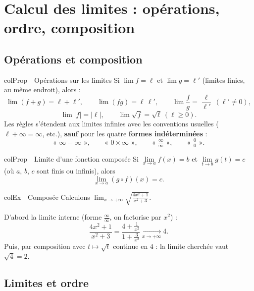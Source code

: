 \documentclass[11pt,a4paper]{article}
\newenvironment{propriete}[1][Propriété]
  {\begin{fiche}{colProp}{\ding{72}~~#1}}{\end{fiche}}
\newenvironment{exemple}[1][Exemple]
  {\begin{fiche}{colEx}{\ding{217}~~#1}}{\end{fiche}}
\begin{document}
\section{Calcul des limites : opérations, ordre, composition}

\subsection{Opérations et composition}

\begin{propriete}[Opérations sur les limites]
Si $\lim f = \ell$ et $\lim g = \ell'$ (limites finies, au même endroit), alors :
\[
  \lim (f + g) = \ell + \ell', \qquad
  \lim (fg) = \ell\,\ell', \qquad
  \lim \frac{f}{g} = \frac{\ell}{\ell'} \ (\ell' \neq 0),
\]
\[
  \lim |f| = |\ell|, \qquad
  \lim \sqrt{f} = \sqrt{\ell} \ (\ell \geq 0).
\]
Les règles s'étendent aux limites infinies avec les conventions usuelles ($\ell + \infty = \infty$, etc.), \textbf{sauf} pour les quatre \textbf{formes indéterminées} :
\[
  \text{« } \infty - \infty \text{ »}, \qquad
  \text{« } 0 \times \infty \text{ »}, \qquad
  \text{« } \tfrac{\infty}{\infty} \text{ »}, \qquad
  \text{« } \tfrac{0}{0} \text{ »}.
\]
\end{propriete}

\begin{propriete}[Limite d'une fonction composée]
Si $\lim\limits_{x \to a} f(x) = b$ et $\lim\limits_{t \to b} g(t) = c$ (où $a$, $b$, $c$ sont finis ou infinis), alors
\[
  \lim_{x \to a} (g \circ f)(x) = c.
\]
\end{propriete}

\begin{exemple}[Composée]
Calculons $\displaystyle\lim_{x \to +\infty} \sqrt{\frac{4x^2 + 1}{x^2 + 3}}$.

\smallskip
D'abord la limite interne (forme $\frac{\infty}{\infty}$, on factorise par $x^2$) :
\[
  \frac{4x^2 + 1}{x^2 + 3} = \frac{4 + \frac{1}{x^2}}{1 + \frac{3}{x^2}}
  \xrightarrow[x \to +\infty]{} 4.
\]
Puis, par composition avec $t \mapsto \sqrt{t}$ continue en $4$ : la limite cherchée vaut $\sqrt{4} = 2$.
\end{exemple}

\subsection{Limites et ordre}
\end{document}
